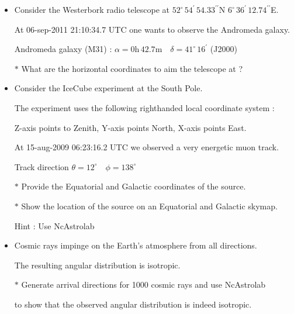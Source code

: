 {\red
\begin{itemize}
\item Consider the Westerbork radio telescope at
      $52^{\circ}\,54^{\prime}\,54.33^{\prime\prime}$N
      $6^{\circ}\,36^{\prime}\,12.74^{\prime\prime}$E.
\item[] At 06-sep-2011 21:10:34.7 UTC one wants to observe the Andromeda galaxy.
\item[] Andromeda galaxy (M31) : $\alpha=0\text{h}\,42.7\text{m} \quad \delta=41^{\circ}\,16^{\prime}$ (J2000)
\item[$\ast$] What are the horizontal coordinates to aim the telescope at ?
\item Consider the IceCube experiment at the South Pole.
\item[] The experiment uses the following righthanded local coordinate system :
\item[] Z-axis points to Zenith, Y-axis points North, X-axis points East.
\item[] At 15-aug-2009 06:23:16.2 UTC we observed a very energetic muon track.
\item[] Track direction $\theta=12^{\circ} \quad \phi=138^{\circ}$
\item[$\ast$] Provide the Equatorial and Galactic coordinates of the source.
\item[$\ast$] Show the location of the source on an Equatorial and Galactic skymap.
\item[] Hint : Use NcAstrolab
\end{itemize}
}

\Tr
{\red
\begin{itemize}
\item Cosmic rays impinge on the Earth's atmosphere from all directions.
\item[] The resulting angular distribution is isotropic.
\item[$\ast$] Generate arrival directions for 1000 cosmic rays and use NcAstrolab
\item[] to show that the observed angular distribution is indeed isotropic.
\end{itemize}
}